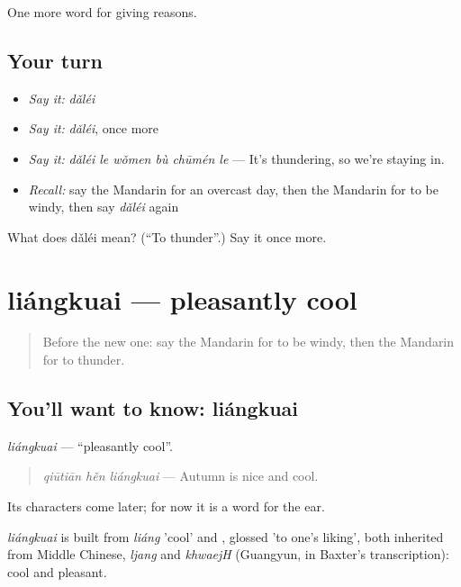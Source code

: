 \begin{grammarlens}[title={What you've built}]
One more word for giving reasons.
\end{grammarlens}

\subsection*{Your turn}
\begin{itemize}
\raggedright
  \item \emph{Say it:} \emph{dǎléi}
  \item \emph{Say it:} \emph{dǎléi}, once more
  \item \emph{Say it:} \emph{dǎléi le wǒmen bù chūmén le} — It's thundering, so we're staying in.
  \item \emph{Recall:} say the Mandarin for an overcast day, then the Mandarin for to be windy, then say \emph{dǎléi} again
\end{itemize}

\begin{tcolorbox}[breakable,colback=teal!4,colframe=teal!35!black,title={Before you move on}]
What does dǎléi mean? (\textquotedblleft{}To thunder\textquotedblright{}.) Say it once more.
\end{tcolorbox}
\section[liángkuai]{liángkuai — pleasantly cool}

\label{lesson:ZH-C136-liangkuai}



\begin{quote}
Before the new one: say the Mandarin for to be windy, then the Mandarin for to thunder.
\end{quote}

\subsection*{You'll want to know: liángkuai}
\emph{liángkuai} — \textquotedblleft{}pleasantly cool\textquotedblright{}.

\begin{quote}
\emph{qiūtiān hěn liángkuai} — Autumn is nice and cool.
\end{quote}

Its characters come later; for now it is a word for the ear.

\begin{cousinweb}
\emph{liángkuai} is built from \emph{liáng} 'cool' and , glossed 'to one's liking', both inherited from Middle Chinese, \emph{ljang} and \emph{khwaejH} (Guangyun, in Baxter's transcription): cool and pleasant.
\end{cousinweb}

